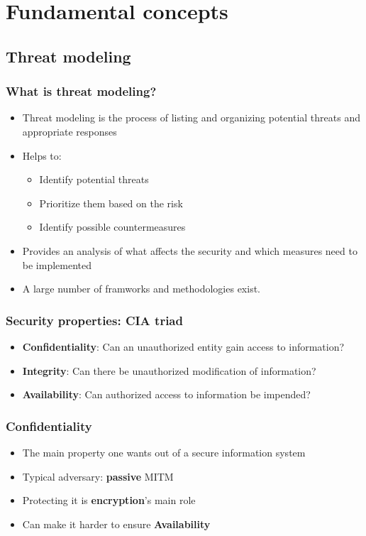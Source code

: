 \section{Fundamental concepts}

\subsection{Threat modeling}

\begin{frame}
  \frametitle{What is threat modeling?}
  \begin{itemize}
    \item Threat modeling is the process of listing and organizing potential
      threats and appropriate responses
    \item Helps to:
      \begin{itemize}
        \item Identify potential threats
        \item Prioritize them based on the risk
        \item Identify possible countermeasures
      \end{itemize}
    \item Provides an analysis of what affects the security and which measures
      need to be implemented
    \item A large number of framworks and methodologies exist.
  \end{itemize}
\end{frame}

\begin{frame}
  \frametitle{Security properties: CIA triad}
  \begin{itemize}
    \item \textbf{Confidentiality}:
          Can an unauthorized entity gain access to information?
    \item \textbf{Integrity}:
          Can there be unauthorized modification of information?
    \item \textbf{Availability}:
          Can authorized access to information be impended?
  \end{itemize}
\end{frame}

\begin{frame}
  \frametitle{Confidentiality}
  \begin{itemize}
    \item The main property one wants out of a secure information system
    \item Typical adversary: \textbf{passive} MITM
    \item Protecting it is \textbf{encryption}'s main role
    \item Can make it harder to ensure \textbf{Availability}
  \end{itemize}
\end{frame}

